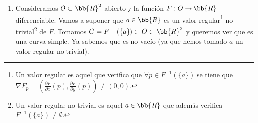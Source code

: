 \begin{ejemplo}
\begin{enumerate}
\begin{proof}
\begin{gather*}
                \pi(x,y) = x
            \end{gather*}
            y se verificará que 
            \begin{gather*}
                (\pi \circ \alpha)(t) = \pi ( \alpha(t)) = \pi(t, f(t)) = t\\
                (\alpha \circ \pi)(x, f(x)) = \alpha(\pi(x, f(x))) = \alpha(x) = (x, f(x))
            \end{gather*}
            Concluimos que $\pi$ es la inversa de $\alpha$ y además es continua (ya que la proyección siempre lo es\footnote{Contenido estudiado en Topología I}) por lo que $\alpha : I \to V$ es un homeomorfismo.
        \end{proof}
        Una consecuencia clara es que todas las rectas de $\bb{R}^2$ son curvas simples (las rectas verticales son grafos de funciones de $y$, intercambiando los papeles de $x$ e $y$). Por la primera observación (apartado~\ref{ej:abierto}) tendremos también que todos los segmentos abiertos de $\bb{R}^2$ son curvas simples, y por la segunda (apartado~\ref{ej:union}) también lo será cualquier unión de ellos en la que cada segmento sea abierto en la unión (no vale, por ejemplo, para dos segmentos que se cruzan).

        \item\label{ej:nivel} Consideramos $O\subset \bb{R}^2$ abierto y la función $F:O \to \bb{R}$ diferenciable. Vamos a suponer que $a\in \bb{R}$ es un valor regular\footnote{Un valor regular es aquel que verifica que $\forall p \in F^{-1}(\{a\})$ se tiene que $\nabla F_p = \left( \frac{\partial F}{\partial x} (p), \frac{\partial F}{\partial y}(p)\right) \neq (0,0)$.}
        no trivial\footnote{Un valor regular no trivial es aquel $a\in \bb{R}$ que además verifica $F^{-1}(\{a\}) \neq \emptyset$.} 
        de $F$. Tomamos $C = F^{-1}(\{a\}) \subset O \subset \bb{R}^2$ y queremos ver que es una curva simple. Ya sabemos que es no vacío (ya que hemos tomado $a$ un valor regular no trivial). \\

        \begin{figure}[H]
            \centering
\end{figure}
\end{enumerate}
\end{ejemplo}
